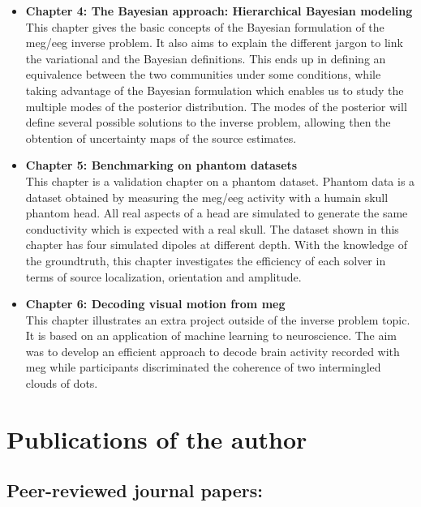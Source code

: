 \begin{itemize}
\item \textbf{Chapter 4: The Bayesian approach: Hierarchical Bayesian modeling}\\
This chapter gives the basic concepts of the Bayesian formulation of the \ac{meg}/\ac{eeg} inverse problem. It also aims to explain the different jargon to link the variational and the Bayesian definitions. This ends up in defining an equivalence between the two communities under some conditions, while taking advantage of the Bayesian formulation which enables us to study the multiple modes of the posterior distribution. The modes of the posterior will define several possible solutions to the inverse problem, allowing then the obtention of uncertainty maps of the source estimates. 

\item \textbf{Chapter 5: Benchmarking on phantom datasets}\\
This chapter is a validation chapter on a phantom dataset. Phantom data is a dataset obtained by measuring the \ac{meg}/\ac{eeg} activity with a humain skull phantom head. All real aspects of a head are simulated to generate the same conductivity which is expected with a real skull. The dataset shown in this chapter has four simulated dipoles at different depth. With the knowledge of the groundtruth, this chapter investigates the efficiency of each solver in terms of source localization, orientation and amplitude.

\item \textbf{Chapter 6: Decoding visual motion from \ac{meg}}\\
This chapter illustrates an extra project outside of the inverse problem topic. It is based on an application of machine learning to neuroscience. The aim was to develop an efficient approach to decode brain activity recorded with \ac{meg} while participants discriminated the coherence of two intermingled clouds of dots.
\end{itemize}

\newpage
\section{Publications of the author}
\subsection*{Peer-reviewed journal papers:}


